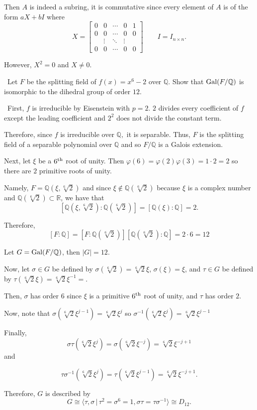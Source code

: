 \documentclass[12pt]{Qual}
\begin{document}
\begin{solution}
Then $A$ is indeed a subring, it is commutative since every element of $A$ is of the form $aX+bI$ where $$X=\begin{bmatrix}
0 & 0 & \cdots & 0 & 1 \\
0 & 0  &\cdots & 0 & 0\\
& \vdots &\ddots & \vdots & \\
0 & 0 &\cdots & 0 & 0
\end{bmatrix}\qquad I=I_{n\times n}.$$

However, $X^2=0$ and $X\not=0.$
\end{solution}
\newpage



\begin{problem} $\,$
Let $F$ be the splitting field of $f(x)=x^6-2$ over $\mathbb{Q}$. Show that $\text{Gal}(F/\mathbb{Q})$ is isomorphic to the dihedral group of order $12.$
\end{problem}


\begin{solution}$\,$
First, $f$ is irreducible by Eisenstein with $p=2$. $2$ divides every coefficient of $f$ except the leading coefficient and $2^2$ does not divide the constant term.

Therefore, since $f$ is irreducible over $\mathbb{Q},$ it is separable. Thus, $F$ is the splitting field of a separable polynomial over $\mathbb{Q}$ and so $F/\mathbb{Q}$ is a Galois extension.

Next, let $\xi$ be a $6^\text{th}$ root of unity. Then $\varphi(6)=\varphi(2)\varphi(3)=1\cdot 2=2$ so there are $2$ primitive roots of unity.

Namely, $F=\mathbb{Q}(\xi,\sqrt[6]{2})$ and since $\xi\notin\mathbb{Q}(\sqrt[6]{2})$ because $\xi$ is a complex number and $\mathbb{Q}(\sqrt[6]{2})\subset\mathbb{R}$, we have that $$[\mathbb{Q}(\xi,\sqrt[6]{2}):\mathbb{Q}(\sqrt[6]{2})]=[\mathbb{Q}(\xi):\mathbb{Q}]=2.$$

Therefore, $$[F:\mathbb{Q}]=[F:\mathbb{Q}(\sqrt[6]{2})][\mathbb{Q}(\sqrt[6]{2}):\mathbb{Q}]=2\cdot 6=12$$

Let $G=\text{Gal}(F/\mathbb{Q})$, then $|G|=12$.

Now, let $\sigma\in G$ be defined by $\sigma(\sqrt[6]{2})=\sqrt[6]{2}\xi$, $\sigma(\xi)=\xi$, and $\tau\in G$ be defined by $\tau(\sqrt[6]{2}\xi)=\sqrt[6]{2}\xi^{-1}=$.

Then, $\sigma$ has order $6$ since $\xi$ is a primitive $6^\text{th}$ root of unity, and $\tau$ has order $2$.

Now, note that $\sigma(\sqrt[6]{2}\xi^{j-1})=\sqrt[6]{2}\xi^j$ so $\sigma^{-1}(\sqrt[6]{2}\xi^j)=\sqrt[6]{2}\xi^{j-1}$

Finally, $$\sigma\tau(\sqrt[6]{2}\xi^j)=\sigma(\sqrt[6]{2}\xi^{-j})=\sqrt[6]{2}\xi^{-j+1}$$ and

$$\tau\sigma^{-1}(\sqrt[6]{2}\xi^j)=\tau(\sqrt[6]{2}\xi^{j-1})=\sqrt[6]{2}\xi^{-j+1}.$$

Therefore, $G$ is described by $$G\cong \langle \tau,\sigma\,|\,\tau^2=\sigma^6=1,\sigma\tau=\tau\sigma^{-1}\rangle\cong D_{12}.$$
\end{solution}
\newpage
\end{document}
